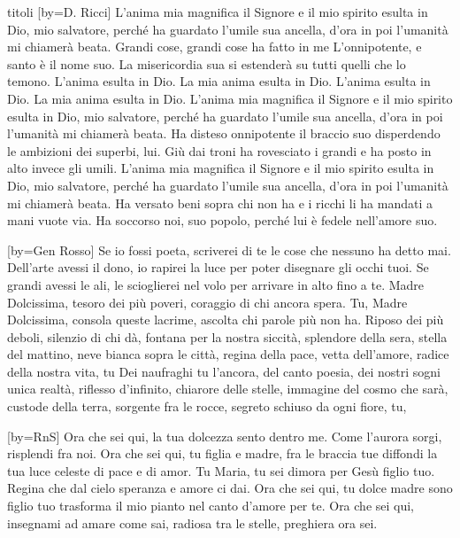 \begin{songs}{titoli}
[by={D. Ricci}]
\beginverse
L'anima mia magnifica il Signore
e il mio spirito esulta in Dio, mio salvatore,
perché ha guardato l'umile sua ancella,
d'ora in poi l'umanità mi chiamerà beata.
Grandi cose, grandi cose ha fatto in me
L'onnipotente, e santo è il nome suo.
La misericordia sua si estenderà
su tutti quelli che lo temono.
\endverse
\beginchorus
L'anima esulta in Dio. La mia anima esulta in Dio.
L'anima esulta in Dio. La mia anima esulta in Dio.
\endchorus
\beginverse
L'anima mia magnifica il Signore
e il mio spirito esulta in Dio, mio salvatore,
perché ha guardato l'umile sua ancella,
d'ora in poi l'umanità mi chiamerà beata.
Ha disteso onnipotente il braccio suo
disperdendo le ambizioni dei superbi, lui.
Giù dai troni ha rovesciato i grandi e
ha posto in alto invece gli umili.
\endverse
\beginverse
L'anima mia magnifica il Signore
e il mio spirito esulta in Dio, mio salvatore,
perché ha guardato l'umile sua ancella,
d'ora in poi l'umanità mi chiamerà beata.
Ha versato beni sopra chi non ha
e i ricchi li ha mandati a mani vuote via.
Ha soccorso noi, suo popolo, perché
lui è fedele nell'amore suo.
\endverse
\endsong

[by={Gen Rosso}]
\beginverse
Se io fossi poeta, scriverei di te le cose che nessuno ha detto mai.
Dell'arte avessi il dono, io rapirei la luce per poter disegnare gli occhi tuoi.
Se grandi avessi le ali, le scioglierei nel volo per arrivare in alto fino a te.
\endverse
\beginchorus
Madre Dolcissima,
tesoro dei più poveri, coraggio di chi ancora spera. Tu,
Madre Dolcissima, consola queste lacrime, ascolta chi parole più non ha.
\endchorus
\beginverse
Riposo dei più deboli, silenzio di chi dà, fontana per la nostra siccità,
splendore della sera, stella del mattino, neve bianca sopra le città,
regina della pace, vetta dell'amore, radice della nostra vita, tu
\endverse
\beginverse
Dei naufraghi tu l'ancora, del canto poesia, dei nostri sogni unica realtà,
riflesso d'infinito, chiarore delle stelle, immagine del cosmo che sarà,
custode della terra, sorgente fra le rocce, segreto schiuso da ogni fiore, tu,
\endverse
\endsong

[by={RnS}]
\beginverse
Ora che sei qui, la tua dolcezza sento dentro me.
Come l'aurora sorgi, risplendi fra noi.
Ora che sei qui, tu figlia e madre, fra le braccia tue
diffondi la tua luce celeste di pace e di amor.
\endverse
\beginchorus
Tu Maria, tu sei dimora per Gesù figlio tuo.
Regina che dal cielo speranza e amore ci dai.
\endchorus
\beginverse
Ora che sei qui, tu dolce madre sono figlio tuo
trasforma il mio pianto nel canto d'amore per te.
\endverse
\beginverse
Ora che sei qui, insegnami ad amare come sai,
radiosa tra le stelle, preghiera ora sei.
\endverse
\endsong


\end{songs}
